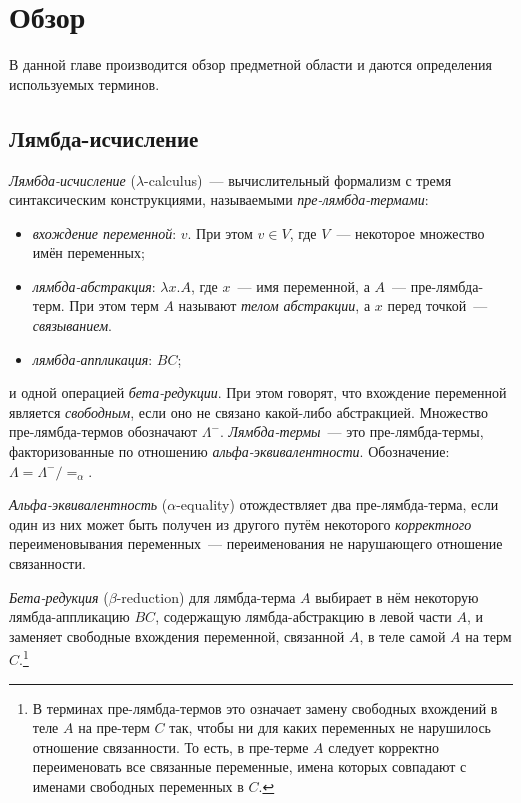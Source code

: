 \chapter{Обзор
}
\label{chapter1}

В данной главе производится обзор предметной области и даются определения используемых терминов.

\section{Лямбда-исчисление}

\emph{Лямбда-исчисление} ($\lambda$-calculus)~--- вычислительный формализм
с тремя синтаксическим конструкциями, называемыми \emph{пре-лямбда-термами}:
\begin{itemize}
\item \emph{вхождение переменной}: $v$. При этом $v \in V$, где $V$~--- некоторое множество имён переменных;
\item \emph{лямбда-абстракция}: $\lambda x.A$, где $x$~--- имя переменной, а $A$~--- пре-лямбда-терм. При этом терм $A$ называют \emph{телом абстракции}, а $x$ перед точкой~--- \emph{связыванием}.
\item \emph{лямбда-аппликация}: $B C$;
\end{itemize}
и одной операцией \emph{бета-редукции}.
При этом говорят, что вхождение переменной является \emph{свободным},
если оно не связано какой-либо абстракцией.
Множество пре-лямбда-термов обозначают $\Lambda^{-}$.
\emph{Лямбда-термы}~--- это пре-лямбда-термы, факторизованные по отношению \emph{альфа-эквивалентности}.
Обозначение: $\Lambda = \Lambda^{-} / =_{\alpha} $.

\emph{Альфа-эквивалентность} ($\alpha$-equality) отождествляет два пре-лямбда-терма, если один из них может быть получен из другого путём некоторого \emph{корректного} переименовывания переменных~--- переименования не нарушающего отношение связанности.

\emph{Бета-редукция} ($\beta$-reduction) для лямбда-терма $A$ выбирает в нём некоторую лямбда-аппликацию $B C$, содержащую лямбда-абстракцию в левой части $A$, и заменяет свободные вхождения переменной, связанной $A$, в теле самой $A$ на терм $C$.\footnote{В терминах пре-лямбда-термов это означает замену свободных вхождений в теле $A$ на пре-терм $C$ так, чтобы ни для каких переменных не нарушилось отношение связанности. То есть, в пре-терме $A$ следует корректно переименовать все связанные переменные, имена которых совпадают с именами свободных переменных в $C$.}

